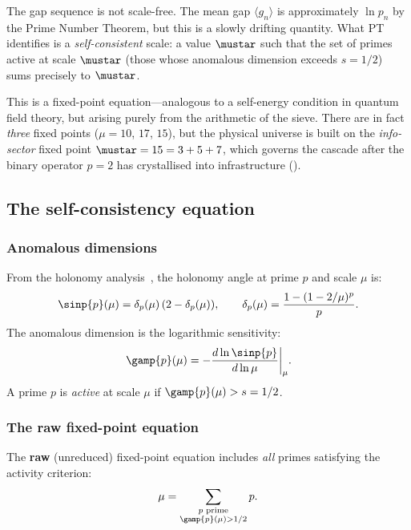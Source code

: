 \documentclass[12pt,a4paper]{article}
\begin{document}
The gap sequence is not scale-free. The mean gap $\langle g_n \rangle$
is approximately $\ln p_n$ by the Prime Number Theorem, but this
is a slowly drifting quantity. What PT identifies is a \emph{self-consistent}
scale: a value $\mustar$ such that the set of primes active at
scale $\mustar$ (those whose anomalous dimension exceeds $s = 1/2$)
sums precisely to $\mustar$.

This is a fixed-point equation---analogous to a self-energy condition
in quantum field theory, but arising purely from the arithmetic of
the sieve. There are in fact \emph{three} fixed points ($\mu = 10$,
$17$, $15$), but the physical universe is built on the
\emph{info-sector} fixed point $\mustar = 15 = 3 + 5 + 7$, which
governs the cascade after the binary operator $p = 2$ has crystallised
into infrastructure (\cite{companion_M1}).

\subsection{The self-consistency equation}
\label{sec:ch8_self_consistency}

\subsubsection{Anomalous dimensions}

From the holonomy analysis~\cite{companion_M2}, the holonomy angle at prime $p$ and scale $\mu$ is:
\begin{equation}
  \sinp{p}(\mu) = \delta_p(\mu)\,(2 - \delta_p(\mu)),
  \qquad \delta_p(\mu) = \frac{1 - (1 - 2/\mu)^p}{p}.
  \label{eq:holonomy_angle}
\end{equation}
The anomalous dimension is the logarithmic sensitivity:
\begin{equation}
  \gamp{p}(\mu) = -\frac{d\ln\sinp{p}}{d\ln\mu}\biggr|_\mu.
  \label{eq:gamma_def}
\end{equation}
A prime $p$ is \emph{active} at scale $\mu$ if $\gamp{p}(\mu) > s = 1/2$.

\subsubsection{The raw fixed-point equation}
\label{sec:ch8_raw_fp}

The \textbf{raw} (unreduced) fixed-point equation includes \emph{all}
primes satisfying the activity criterion:
\begin{equation}
  \mu = \sum_{\substack{p \text{ prime} \\ \gamp{p}(\mu) > 1/2}} p.
  \label{eq:fixed_point_raw}
\end{equation}
\end{document}
